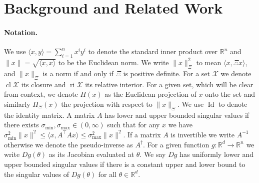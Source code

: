 \documentclass{article} %
\theoremstyle{definition}
\newcommand{\reals}{\mathbb{R}}
\newcommand*\closure[1]{\operatorname{cl}#1}
\newcommand{\ri}{\operatorname{ri}}
\newcommand{\inner}[2]{\langle #1, #2 \rangle}
\newcommand{\id}{\operatorname{Id}}
\begin{document}






\section{Background and Related Work}
\paragraph{Notation.} We use $\inner{x}{y} = \sum_{i=1}^n x^i y^i$ to denote the standard inner product over $\reals^n$ and $\|x\| = \sqrt{\inner{x}{x}}$ to be the Euclidean norm. 
We write $\|x\|^2_{\Xi}$ to mean $\inner{x}{\Xi x}$,  and $\|x\|_{\Xi}$ is a norm if and only if $\Xi$ is positive definite. 
For a set $\mathcal{X}$ we denote $\closure{\mathcal{X}}$ its closure and $\ri \mathcal{X}$ its relative interior.
For a given set, which will be clear from context, we denote $\Pi(x)$ as the Euclidean projection of $x$ onto the set and similarly $\Pi_{\Xi}(x)$ the projection with respect to $\|x\|_{\Xi}$. 
We use $\id$ to denote the identity matrix.
A matrix $A$ has lower and upper bounded singular values if
there exists $\sigma_{\min},\sigma_{\max} \in (0,\infty)$ such that for any $x$ we have $\sigma_{\min}^2\|x\|^2 \leq \inner{x}{A^\top A x} \leq \sigma_{\max}^2\|x\|^2$.
If a matrix $A$ is invertible we write $A^{-1}$ otherwise we denote the pseudo-inverse as $A^{\dag}$.
For a given function $g: \reals^d \to \reals^n$ we write $Dg (\theta)$ as its Jacobian evaluated at $\theta$.
We say $Dg$ has uniformly lower and upper bounded singular values if there is a constant upper and lower bound to the singular values of $Dg(\theta)$ for all  $\theta \in \reals^d$.
 
\end{document}
